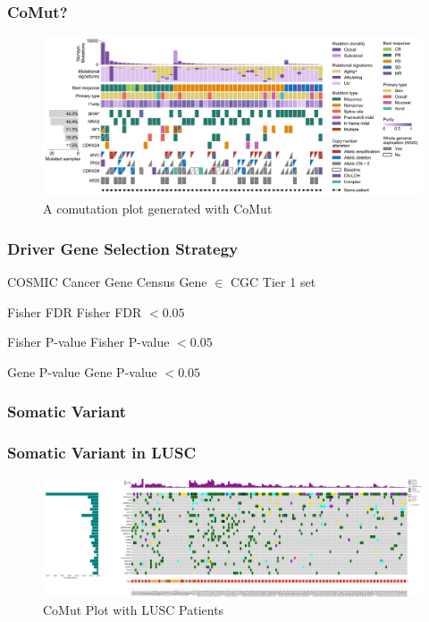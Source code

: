 \documentclass{beamer}
\begin{document}
    \begin{frame}
        \frametitle{CoMut?}

        \begin{figure}
            \includegraphics[width=\linewidth]{figures/Workflow/comut.png}
            \caption{A comutation plot generated with CoMut \protect\cite{comut1}}
        \end{figure}
    \end{frame}

    \begin{frame}
        \frametitle{Driver Gene Selection Strategy}

        \begin{block}{COSMIC Cancer Gene Census \cite{CGC1}}
            Gene $\in$ CGC Tier 1 set
        \end{block}

        \begin{block}{Fisher FDR}
            Fisher FDR $ < 0.05$
        \end{block}

        \begin{block}{Fisher P-value}
            Fisher P-value $ < 0.05$
        \end{block}

        \begin{block}{Gene P-value}
            Gene P-value $ < 0.05 $
        \end{block}
    \end{frame}

    \subsubsection{Somatic Variant}
    \begin{frame}
        \frametitle{Somatic Variant in LUSC}

        \begin{figure}
            \includegraphics[width=\linewidth]{figures/Mutect2/BWA-SQC.pdf}
            \caption{CoMut Plot with LUSC Patients}
        \end{figure}
    \end{frame}
\end{document}
